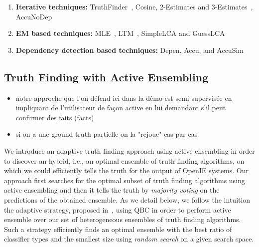 \begin{enumerate}
 \item \textbf{Iterative techniques:} TruthFinder~\cite{YinHY08}, Cosine, 2-Estimates and 3-Estimates~\cite{GallandAMS10}, 
 AccuNoDep~\cite{DongBS09}
 \item \textbf{EM based techniques:} MLE~\cite{WangKLA12}, LTM~\cite{ZhaoRGH12}, SimpleLCA and GuessLCA~\cite{PasternackR13}
 \item \textbf{Dependency detection based techniques:} Depen, Accu, and AccuSim~\cite{DongBS09}
\end{enumerate}



\subsection{Truth Finding with Active Ensembling}
\begin{itemize}
 \item notre approche que l'on défend ici dans la démo est  semi supervisée en impliquant de l'utilisateur de façon active
en lui demandant s'il peut confirmer des faits (facts)
\item si on a une ground truth partielle on la "rejoue" cas par cas
\end{itemize}

\medskip

We introduce an adaptive truth finding approach using active ensembling in order to discover an hybrid, i.e., an optimal
ensemble of truth finding algorithms, on which we could efficiently tells the truth for the output of OpenIE systems.
Our approach first searches for the optimal subset of truth finding algorithms using active ensembling and then it 
tells the truth by \emph{majority voting} on the predictions of the obtained ensemble. As we detail below, we follow the intuition
the adaptive strategy, proposed in~\cite{Lu15}, using QBC in order to perform active ensemble over our set of heterogeneous 
ensembles of truth finding algorithms. Such a strategy efficiently finds an optimal ensemble with the best ratio of classifier
types and the smallest size using \emph{random search} on a given search space.


